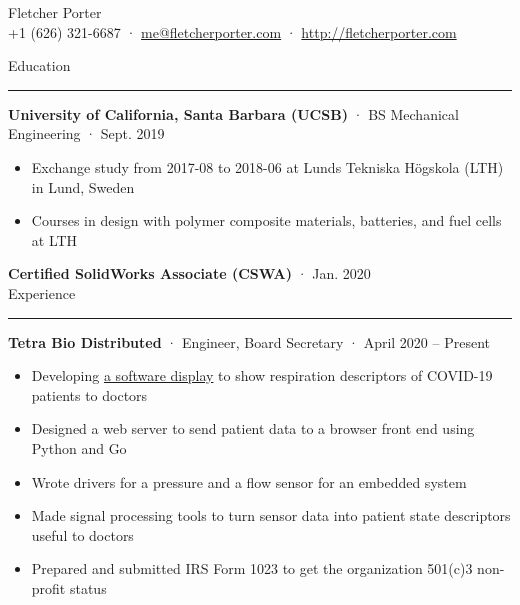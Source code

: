 \documentclass[12pt, oneside]{article}
\newcommand{\titlestyle}[1] {
	{\fontsize{40pt}{1em}\selectfont \textcolor{new_red}{\textsf{#1}}} \\
}
\newcommand{\headingstyleJobs}[1] {
	{\fontsize{18pt}{1em}\selectfont \textcolor{new_red}{\textsf{#1}}}
	\textcolor{new_red}{\rule{3.25in}{0.5pt}} \vspace{3pt}
}
\newcommand{\infostyle}[1] {
	{\selectfont #1} \\ \vspace{10pt}
}
\newcommand{\jobtitle}[3] {
	{\bf #1} · {#2} · {#3} \vspace{-7pt} \\
}
\newcommand{\certification}[2] {
	{\bf #1} · {#2} \vspace{5pt} \\
}
\begin{document}
\begin{flushleft}



\titlestyle{Fletcher Porter}
\infostyle{+1 (626) 321-6687 · \href{mailto:me@fletcherporter.com}{me@fletcherporter.com} · \url{http://fletcherporter.com}}


\headingstyleJobs{Education}

\jobtitle{University of California, Santa Barbara (UCSB)}{BS Mechanical Engineering}{Sept. 2019}
\begin{itemize}
	\item Exchange study from 2017-08 to 2018-06 at Lunds Tekniska Högskola (LTH) in Lund, Sweden \\
	\item Courses in design with polymer composite materials, batteries, and fuel cells at LTH
\end{itemize}


\certification{Certified SolidWorks Associate (CSWA)}{Jan. 2020}


\headingstyleJobs{Experience}

\jobtitle{Tetra Bio Distributed}{Engineer, Board Secretary}{April 2020 – Present}
\begin{itemize}
	\item Developing \href{https://github.com/tetrabiodistributed/project-tetra-display}{a software display} to show respiration descriptors of COVID-19 patients to doctors \\
	\item Designed a web server to send patient data to a browser front end using Python and Go \\
	\item Wrote drivers for a pressure and a flow sensor for an embedded system
	\item Made signal processing tools to turn sensor data into patient state descriptors useful to doctors \\
	\item Prepared and submitted IRS Form 1023 to get the organization 501(c)3 non-profit status \\
\end{itemize}


\end{flushleft}
\end{document}
